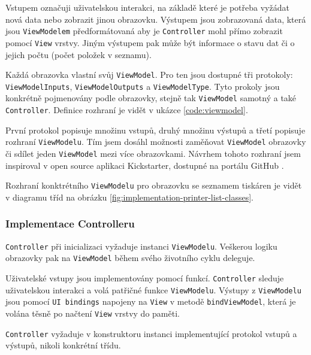 Vstupem označuji uživatelskou interakci, na základě které je potřeba vyžádat nová data nebo zobrazit jinou obrazovku.
Výstupem jsou zobrazovaná data, která jsou \texttt{ViewModelem} předformátovaná aby je \texttt{Controller} mohl přímo zobrazit pomocí \texttt{View} vrstvy.
Jiným výstupem pak může být informace o stavu dat či o jejich počtu (počet položek v seznamu).

Každá obrazovka vlastní svůj \texttt{ViewModel}.
Pro ten jsou dostupné tři protokoly: \texttt{ViewModelInputs}, \texttt{ViewModelOutputs} a \texttt{ViewModelType}.
Tyto prokoly jsou konkrétně pojmenovány podle obrazovky, stejně tak \texttt{ViewModel} samotný a také \texttt{Controller}.
Definice rozhraní je vidět v ukázce \ref{code:viewmodel}.


První protokol popisuje množinu vstupů, druhý množinu výstupů a třetí popisuje rozhraní \texttt{ViewModelu}.
Tím jsem dosáhl možnosti zaměňovat \texttt{ViewModel} obrazovky či sdílet jeden \texttt{ViewModel} mezi více obrazovkami.
Návrhem tohoto rozhraní jsem inspiroval v open source aplikaci Kickstarter, dostupné na portálu GitHub \cite{github-kickstarter}.

Rozhraní konktrétního \texttt{ViewModelu} pro obrazovku se seznamem tiskáren je vidět v diagramu tříd na obrázku \ref{fig:implementation-printer-list-classes}.


\subsubsection*{Implementace Controlleru}

\texttt{Controller} při inicializaci vyžaduje instanci \texttt{ViewModelu}.
Veškerou logiku obrazovky pak na \texttt{ViewModel} během svého životního cyklu deleguje.

Uživatelské vstupy jsou implementovány pomocí funkcí.
\texttt{Controller} sleduje uživatelskou interakci a volá patřičné funkce \texttt{ViewModelu}.
Výstupy z \texttt{ViewModelu} jsou pomocí \texttt{UI bindings} napojeny na \texttt{View} v metodě \texttt{bindViewModel}, která je volána těsně po načtení \texttt{View} vrstvy do paměti.

\texttt{Controller} vyžaduje v konstruktoru instanci implementující protokol vstupů a výstupů, nikoli konkrétní třídu.

